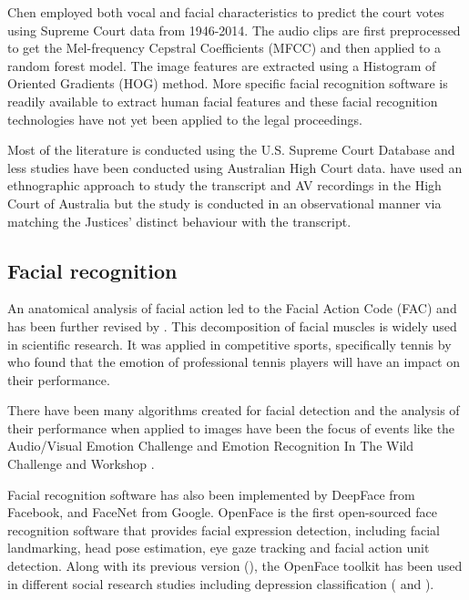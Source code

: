 \documentclass{monashthesis}
\begin{document}
Chen \autocite*{chen2018justice} employed both vocal and facial characteristics to predict the court votes using Supreme Court data from 1946-2014. The audio clips are first preprocessed to get the Mel-frequency Cepstral Coefficients (MFCC) and then applied to a random forest model. The image features are extracted using a Histogram of Oriented Gradients (HOG) method. More specific facial recognition software is readily available to extract human facial features and these facial recognition technologies have not yet been applied to the legal proceedings.

Most of the literature is conducted using the U.S. Supreme Court Database and less studies have been conducted using Australian High Court data. \textcite{tutton2018judicial} have used an ethnographic approach to study the transcript and AV recordings in the High Court of Australia but the study is conducted in an observational manner via matching the Justices' distinct behaviour with the transcript.

\hypertarget{facial-recognition}{%
\subsection{Facial recognition}\label{facial-recognition}}

An anatomical analysis of facial action \autocite{ekman1976measuring} led to the Facial Action Code (FAC) \autocite{ekman1978} and has been further revised by \textcite{ekman2002facial}. This decomposition of facial muscles is widely used in scientific research. It was applied in competitive sports, specifically tennis by \textcite{kovalchik2018going} who found that the emotion of professional tennis players will have an impact on their performance.

There have been many algorithms created for facial detection and the analysis of their performance when applied to images have been the focus of events like the Audio/Visual Emotion Challenge \autocites{schuller2012avec}{schuller2011avec} and Emotion Recognition In The Wild Challenge and Workshop \autocites{dhall2013emotion}{kahou2013combining}.

Facial recognition software has also been implemented by DeepFace \autocite{taigman2014deepface} from Facebook, and FaceNet \autocite{schroff2015facenet} from Google. OpenFace \autocite{baltrusaitis2018openface} is the first open-sourced face recognition software that provides facial expression detection, including facial landmarking, head pose estimation, eye gaze tracking and facial action unit detection. Along with its previous version (\textcite{baltruvsaitis2016openface}), the OpenFace toolkit has been used in different social research studies including depression classification (\textcite{yang2016decision} and \textcite{nasir2016multimodal}).
\end{document}
